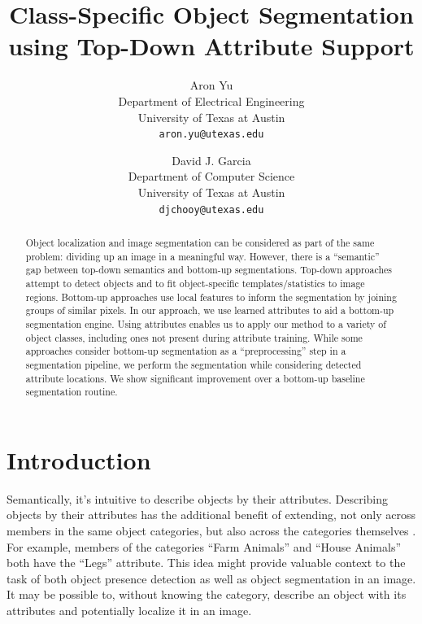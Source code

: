\documentclass[10pt,twocolumn,letterpaper]{article}
\begin{document}
\title{Class-Specific Object Segmentation using Top-Down Attribute Support}

\author{Aron Yu\\
Department of Electrical Engineering\\
University of Texas at Austin\\
{\tt\small aron.yu@utexas.edu}
\and
David J. Garcia\\
Department of Computer Science\\
University of Texas at Austin\\
{\tt\small djchooy@utexas.edu}
}

\maketitle

\begin{abstract}
 Object localization and image segmentation can be considered as part of the same problem: dividing up an image in a meaningful way.  However, there is a ``semantic'' gap between top-down semantics and bottom-up segmentations.  Top-down approaches attempt to detect objects and to fit object-specific templates/statistics to image regions.  Bottom-up approaches use local features to inform the segmentation by joining groups of similar pixels.  In our approach, we use learned attributes to aid a bottom-up segmentation engine.  Using attributes enables us to apply our method to a variety of object classes, including ones not present during attribute training.  While some approaches consider bottom-up segmentation as a ``preprocessing'' step in a segmentation pipeline, we perform the segmentation while considering detected attribute locations.  We show significant improvement over a bottom-up baseline segmentation routine.
\end{abstract}

\section{Introduction}
Semantically, it's intuitive to describe objects by their attributes.  Describing objects by their attributes has the additional benefit of extending, not only across members in the same object categories, but also across the categories themselves \cite{Farhadi2009}.  For example, members of the categories ``Farm Animals'' and ``House Animals'' both have the ``Legs'' attribute.  This idea might provide valuable context to the task of both object presence detection as well as object segmentation in an image.  It may be possible to, without knowing the category, describe an object with its attributes and potentially localize it in an image.
\end{document}
